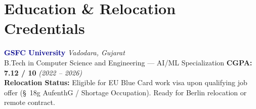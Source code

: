 \documentclass[10pt]{article}
\begin{document}
\section*{Education \& Relocation Credentials}
\noindent\textbf{\textcolor{darkblue}{GSFC University}} \hfill \textit{\small\color{medgray}Vadodara, Gujarat}\\
{\small B.Tech in Computer Science and Engineering --- AI/ML Specialization \hfill \textbf{CGPA: 7.12 / 10} \quad \textit{(2022 -- 2026)}}\\[1.5pt]
{\small\textbf{Relocation Status:} Eligible for EU Blue Card work visa upon qualifying job offer (\S~18g AufenthG / Shortage Occupation). Ready for Berlin relocation or remote contract.}
\end{document}
